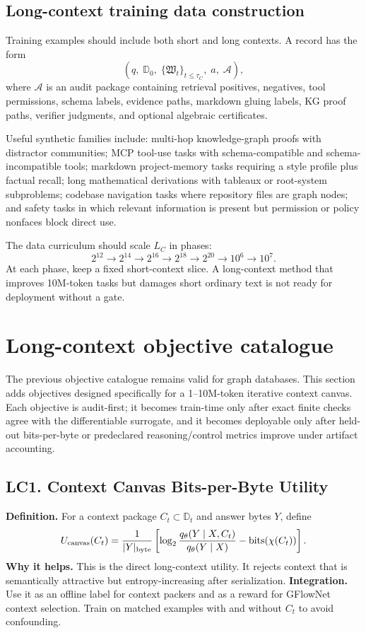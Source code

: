 \documentclass[11pt]{article}
\newcommand{\calA}{\mathcal{A}}
\numberwithin{equation}{section}
\begin{document}
\subsection{Long-context training data construction}
Training examples should include both short and long contexts. A record has the form
\begin{equation}
(q,\;\mathbb{D}_0,\;\{\mathfrak{W}_t\}_{t\le \tau_C},\;a,\;\calA),
\end{equation}
where $\calA$ is an audit package containing retrieval positives, negatives, tool permissions, schema labels, evidence paths, markdown gluing labels, KG proof paths, verifier judgments, and optional algebraic certificates.

Useful synthetic families include: multi-hop knowledge-graph proofs with distractor communities; MCP tool-use tasks with schema-compatible and schema-incompatible tools; markdown project-memory tasks requiring a style profile plus factual recall; long mathematical derivations with tableaux or root-system subproblems; codebase navigation tasks where repository files are graph nodes; and safety tasks in which relevant information is present but permission or policy nonfaces block direct use.

The data curriculum should scale $L_C$ in phases:
\begin{equation}
2^{12}\to 2^{14}\to 2^{16}\to 2^{18}\to 2^{20}\to 10^6\to 10^7.
\end{equation}
At each phase, keep a fixed short-context slice. A long-context method that improves 10M-token tasks but damages short ordinary text is not ready for deployment without a gate.

\section{Long-context objective catalogue}
The previous objective catalogue remains valid for graph databases. This section adds objectives designed specifically for a 1--10M-token iterative context canvas. Each objective is audit-first; it becomes train-time only after exact finite checks agree with the differentiable surrogate, and it becomes deployable only after held-out bits-per-byte or predeclared reasoning/control metrics improve under artifact accounting.

\subsection{LC1. Context Canvas Bits-per-Byte Utility}
\textbf{Definition.} For a context package $C_t\subset\mathbb{D}_t$ and answer bytes $Y$, define
\begin{equation}
U_{\rm canvas}(C_t)=\frac{1}{|Y|_{\rm byte}}\left[\log_2\frac{q_\theta(Y\mid X,C_t)}{q_\theta(Y\mid X)}-\operatorname{bits}(\chi(C_t))\right].
\end{equation}
\textbf{Why it helps.} This is the direct long-context utility. It rejects context that is semantically attractive but entropy-increasing after serialization. \textbf{Integration.} Use it as an offline label for context packers and as a reward for GFlowNet context selection. Train on matched examples with and without $C_t$ to avoid confounding.
\end{document}
